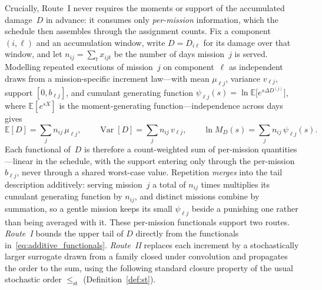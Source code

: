 \documentclass[11pt,a4paper]{article}
\theoremstyle{plain}
\theoremstyle{definition}
\theoremstyle{remark}
\begin{document}
Crucially, Route~I never requires the moments or support of the accumulated damage~$D$ in advance: it consumes only \emph{per-mission} information, which the schedule then assembles through the assignment counts.
Fix a component $(i,\ell)$ and an accumulation window, write $D = D_{i\ell}$ for its damage over that window, and let $n_{ij} = \sum_t x_{ijt}$ be the number of days mission~$j$ is served.
Modelling repeated executions of mission~$j$ on component~$\ell$ as independent draws from a mission-specific increment law---with mean $\mu_{\ell j}$, variance $v_{\ell j}$, support $[0,b_{\ell j}]$, and cumulant generating function $\psi_{\ell j}(s) = \ln \mathbb{E}\big[e^{s\Delta D^{(j)}}\big]$, where $\mathbb{E}[e^{sX}]$ is the moment-generating function---independence across days gives
\begin{equation}\label{eq:additive_functionals}
  \mathbb{E}[D] = \sum_j n_{ij}\,\mu_{\ell j}, \qquad
  \operatorname{Var}[D] = \sum_j n_{ij}\,v_{\ell j}, \qquad
  \ln M_D(s) = \sum_j n_{ij}\,\psi_{\ell j}(s).
\end{equation}
Each functional of~$D$ is therefore a count-weighted sum of per-mission quantities---linear in the schedule, with the support entering only through the per-mission $b_{\ell j}$, never through a shared worst-case value.
Repetition \emph{merges} into the tail description additively: serving mission~$j$ a total of $n_{ij}$ times multiplies its cumulant generating function by $n_{ij}$, and distinct missions combine by summation, so a gentle mission keeps its small $\psi_{\ell j}$ beside a punishing one rather than being averaged with it.
These per-mission functionals support two routes.
\emph{Route~I} bounds the upper tail of $D$ directly from the functionals in~\eqref{eq:additive_functionals}.
\emph{Route~II} replaces each increment by a stochastically larger surrogate drawn from a family closed under convolution and propagates the order to the sum, using the following standard closure property of the usual stochastic order $\le_{\mathrm{st}}$ (Definition~\ref{def:st}).
\end{document}
